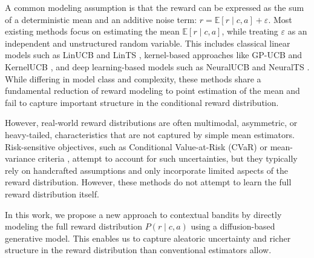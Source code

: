 A common modeling assumption is that the reward can be expressed as the sum of a deterministic mean and an additive noise term: $r = \mathbb{E}[r \mid c, a] + \varepsilon$. Most existing methods focus on estimating the mean $\mathbb{E}[r \mid c, a]$, while treating $\varepsilon$ as an independent and unstructured random variable. This includes classical linear models such as LinUCB \citep{li_contextual-bandit_2010} and LinTS \citep{agrawal_thompson_2014}, kernel-based approaches like GP-UCB \citep{srinivas_gaussian_nodate} and KernelUCB \citep{valko_finite-time_2013}, and deep learning-based models such as NeuralUCB\citep{zhou_neural_2020} and NeuralTS \citep{zhang_neural_2021}. While differing in model class and complexity, these methods share a fundamental reduction of reward modeling to point estimation of the mean and fail to capture important structure in the conditional reward distribution.

However, real-world reward distributions are often multimodal, asymmetric, or heavy-tailed, characteristics that are not captured by simple mean estimators. Risk-sensitive objectives, such as Conditional Value-at-Risk (CVaR) or mean-variance criteria \citep{sani2012risk}, attempt to account for such uncertainties, but they typically rely on handcrafted assumptions and only incorporate limited aspects of the reward distribution. However, these methods do not attempt to learn the full reward distribution itself.


In this work, we propose a new approach to contextual bandits by directly modeling the full reward distribution $P(r \mid c, a)$ using a diffusion-based generative model. This enables us to capture aleatoric uncertainty and richer structure in the reward distribution than conventional estimators allow.